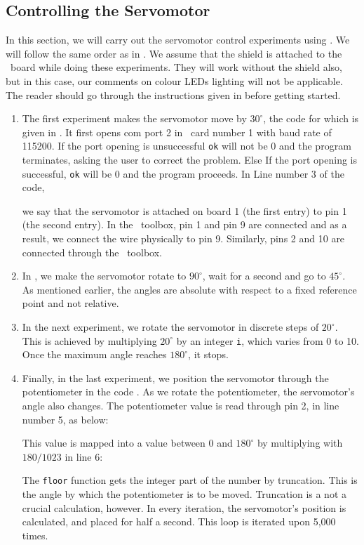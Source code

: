 \subsection{Controlling the Servomotor}
\label{sec:servo-sci}
In this section, we will carry out the servomotor control experiments
using \scilab.  We will follow the same order as in
.  We assume that the shield is attached to the
\arduino\ board while doing these experiments.  They will work without
the shield also, but in this case, our comments on colour LEDs
lighting will not be applicable.  The reader should go through the
instructions given in  before getting started.
\begin{enumerate}
\item The first experiment makes the servomotor move by $30^\circ$,
  the code for which is given in .
  It first opens com port 2 in \arduino\ card number 1 with baud rate
  of 115200.  If the port opening is unsuccessful {\tt ok} will not be
  0 and the program terminates, asking the user to correct the
  problem.  Else If the port opening is successful, {\tt ok} will be 0
  and the program proceeds.  In Line number 3 of the code, \ie\
  
  we say that the servomotor is attached on board 1 (the first entry)
  to pin 1 (the second entry).  In the \scilab\ toolbox, pin 1 and pin
  9 are connected and as a result, we connect the wire physically to
  pin 9.  Similarly, pins 2 and 10 are connected through the
  \scilab\ toolbox.

\item In , we make the servomotor rotate
  to $90^\circ$, wait for a second and go to $45^\circ$.  As mentioned
  earlier, the angles are absolute with respect to a fixed reference
  point and not relative.  

\item In the next experiment, we rotate the servomotor in discrete
  steps of $20^\circ$.  This is achieved by multiplying $20^\circ$ by
  an integer {\tt i}, which varies from 0 to 10.  Once the maximum
  angle reaches $180^\circ$, it stops.  

\item Finally, in the last experiment, we position the servomotor
  through the potentiometer in the code .  As we
  rotate the potentiometer, the servomotor's angle also changes.  The
  potentiometer value is read through pin 2, in line number 5, as
  below:
  
  This value is mapped into a value between 0 and $180^\circ$ by
  multiplying with $180/1023$ in line 6:
  
  The {\tt floor} function gets the integer part of the number by
  truncation.  This is the angle by which the potentiometer is to be
  moved.  Truncation is a not a crucial calculation, however.  In
  every iteration, the servomotor's position is calculated, and placed
  for half a second.  This loop is iterated upon 5,000 times.
\end{enumerate}

